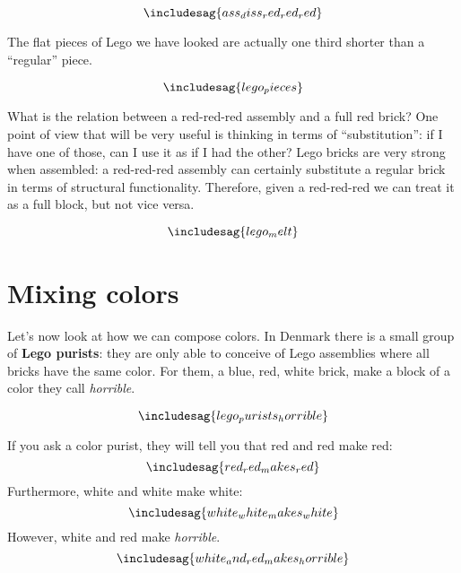 \begin{equation}
\includesag{ass_diss_red_red_red}
\end{equation}

The flat pieces of Lego we have looked are actually one third shorter than a ``regular'' piece.

\begin{equation}
  \includesag{lego_pieces}
\end{equation}

What is the relation between a red-red-red assembly and a full red brick?
One point of view that will be very useful is thinking in terms of ``substitution'': if I have one of those, can I use it as if I had the other?
Lego bricks are very strong when assembled: a red-red-red assembly can certainly substitute
a regular brick in terms of structural functionality.
Therefore, given a red-red-red we can treat it as a full block, but not vice versa.

\begin{equation}
\includesag{lego_melt}
\end{equation}

\section{Mixing colors}

Let's now look at how we can compose colors.
In Denmark there is a small group of \textbf{Lego purists}: they are only able to conceive of Lego assemblies where all bricks have the same color.
For them, a blue, red, white brick, make a block of a color they call \emph{horrible}.

\begin{equation}
\includesag{lego_purists_horrible}
\end{equation}

If you ask a color purist, they will tell you that red and red make red:
%
\begin{equation}
\includesag{red_red_makes_red}
\end{equation}
%
Furthermore, white and white make white:
%
\begin{equation}
\includesag{white_white_makes_white}
\end{equation}
%
However, white and red make \emph{horrible}.
%
\begin{equation}
\includesag{white_and_red_makes_horrible}
\end{equation}


